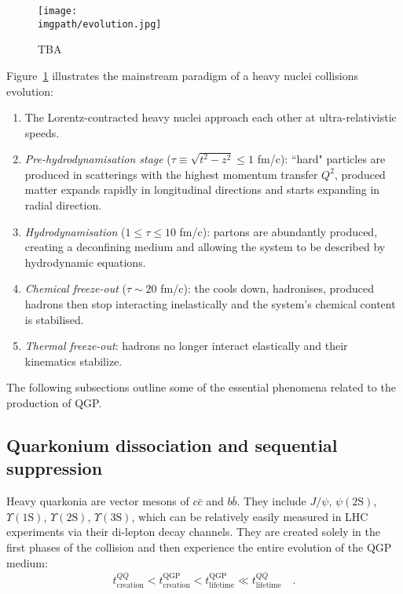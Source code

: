 \begin{figure}[H]
\texttt{[image: \\imgpath/evolution.jpg]}\\
\caption{TBA}
\label{fig:colls:evolution}
\end{figure}

Figure~\ref{fig:colls:evolution} illustrates the mainstream paradigm of a heavy nuclei collisions evolution:
\begin{enumerate}
\item The Lorentz-contracted heavy nuclei approach each other at ultra-relativistic speeds.
\item \textit{Pre-hydrodynamisation stage} ($\tau \equiv \sqrt{t^2 - z^2} \leq 1$ fm/c): ``hard" particles are produced in scatterings with the highest momentum transfer $Q^2$, produced matter expands rapidly in longitudinal directions and starts expanding in radial direction.
\item \textit{Hydrodynamisation} ($1 \leq \tau \leq 10$ fm/c): partons are abundantly produced, creating a deconfining medium and allowing the system to be described by hydrodynamic equations.
\item \textit{Chemical freeze-out} ($\tau \sim 20$ fm/c): the cools down, hadronises, produced hadrons then stop interacting inelastically and the system's chemical content is stabilised.
\item \textit{Thermal freeze-out}: hadrons no longer interact elastically and their kinematics stabilize.
\end{enumerate}

The following subsections outline some of the essential phenomena related to the production of QGP.

\subsection{Quarkonium dissociation and sequential suppression}

Heavy quarkonia are vector mesons of $c\bar{c}$ and $b\bar{b}$. They include $J/\psi$, $\psi(2\mathrm{S})$, $\Upsilon(1\mathrm{S})$, $\Upsilon(2\mathrm{S})$, $\Upsilon(3\mathrm{S})$, which can be relatively easily measured in LHC experiments via their di-lepton decay channels. They are created solely in the first phases of the collision and then experience the entire evolution of the QGP medium:
\begin{equation}
t^{Q\overline{Q}}_\mathrm{creation} < t^\mathrm{QGP}_\mathrm{creation} < t^\mathrm{QGP}_\mathrm{lifetime} \ll t^{Q\overline{Q}}_\mathrm{lifetime} \quad .
\end{equation}

